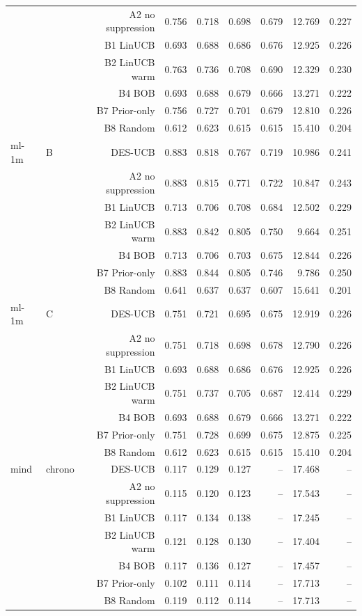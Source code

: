 \begin{tabular}{llrrrrrrr}
 &  & A2 no suppression & 0.756 & 0.718 & 0.698 & 0.679 & 12.769 & 0.227 \\
 &  & B1 LinUCB & 0.693 & 0.688 & 0.686 & 0.676 & 12.925 & 0.226 \\
 &  & B2 LinUCB warm & 0.763 & 0.736 & 0.708 & 0.690 & 12.329 & 0.230 \\
 &  & B4 BOB & 0.693 & 0.688 & 0.679 & 0.666 & 13.271 & 0.222 \\
 &  & B7 Prior-only & 0.756 & 0.727 & 0.701 & 0.679 & 12.810 & 0.226 \\
 &  & B8 Random & 0.612 & 0.623 & 0.615 & 0.615 & 15.410 & 0.204 \\
\midrule
ml-1m & B & DES-UCB & 0.883 & 0.818 & 0.767 & 0.719 & 10.986 & 0.241 \\
 &  & A2 no suppression & 0.883 & 0.815 & 0.771 & 0.722 & 10.847 & 0.243 \\
 &  & B1 LinUCB & 0.713 & 0.706 & 0.708 & 0.684 & 12.502 & 0.229 \\
 &  & B2 LinUCB warm & 0.883 & 0.842 & 0.805 & 0.750 & 9.664 & 0.251 \\
 &  & B4 BOB & 0.713 & 0.706 & 0.703 & 0.675 & 12.844 & 0.226 \\
 &  & B7 Prior-only & 0.883 & 0.844 & 0.805 & 0.746 & 9.786 & 0.250 \\
 &  & B8 Random & 0.641 & 0.637 & 0.637 & 0.607 & 15.641 & 0.201 \\
\midrule
ml-1m & C & DES-UCB & 0.751 & 0.721 & 0.695 & 0.675 & 12.919 & 0.226 \\
 &  & A2 no suppression & 0.751 & 0.718 & 0.698 & 0.678 & 12.790 & 0.226 \\
 &  & B1 LinUCB & 0.693 & 0.688 & 0.686 & 0.676 & 12.925 & 0.226 \\
 &  & B2 LinUCB warm & 0.751 & 0.737 & 0.705 & 0.687 & 12.414 & 0.229 \\
 &  & B4 BOB & 0.693 & 0.688 & 0.679 & 0.666 & 13.271 & 0.222 \\
 &  & B7 Prior-only & 0.751 & 0.728 & 0.699 & 0.675 & 12.875 & 0.225 \\
 &  & B8 Random & 0.612 & 0.623 & 0.615 & 0.615 & 15.410 & 0.204 \\
\midrule
mind & chrono & DES-UCB & 0.117 & 0.129 & 0.127 & -- & 17.468 & -- \\
 &  & A2 no suppression & 0.115 & 0.120 & 0.123 & -- & 17.543 & -- \\
 &  & B1 LinUCB & 0.117 & 0.134 & 0.138 & -- & 17.245 & -- \\
 &  & B2 LinUCB warm & 0.121 & 0.128 & 0.130 & -- & 17.404 & -- \\
 &  & B4 BOB & 0.117 & 0.136 & 0.127 & -- & 17.457 & -- \\
 &  & B7 Prior-only & 0.102 & 0.111 & 0.114 & -- & 17.713 & -- \\
 &  & B8 Random & 0.119 & 0.112 & 0.114 & -- & 17.713 & -- \\
\bottomrule
\end{tabular}